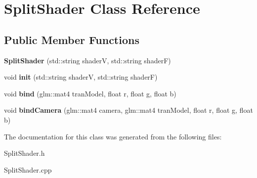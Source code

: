 \hypertarget{class_split_shader}{}\section{Split\+Shader Class Reference}
\label{class_split_shader}
\subsection*{Public Member Functions}
\begin{DoxyCompactItemize}
\item 
\hypertarget{class_split_shader_ab85af89730cc15b1f444d6846fca7c11}{}\label{class_split_shader_ab85af89730cc15b1f444d6846fca7c11} 
{\bfseries Split\+Shader} (std\+::string shaderV, std\+::string shaderF)
\item 
\hypertarget{class_split_shader_a6e3d53230b9c63337027b9fc768db4ca}{}\label{class_split_shader_a6e3d53230b9c63337027b9fc768db4ca} 
void {\bfseries init} (std\+::string shaderV, std\+::string shaderF)
\item 
\hypertarget{class_split_shader_ab25eaac7c011f3ae71acc7742edafc2d}{}\label{class_split_shader_ab25eaac7c011f3ae71acc7742edafc2d} 
void {\bfseries bind} (glm\+::mat4 tran\+Model, float r, float g, float b)
\item 
\hypertarget{class_split_shader_a4f5c5ff7e0ee232a0ff618d76db13d8d}{}\label{class_split_shader_a4f5c5ff7e0ee232a0ff618d76db13d8d} 
void {\bfseries bind\+Camera} (glm\+::mat4 camera, glm\+::mat4 tran\+Model, float r, float g, float b)
\end{DoxyCompactItemize}


The documentation for this class was generated from the following files\+:\begin{DoxyCompactItemize}
\item 
Split\+Shader.\+h\item 
Split\+Shader.\+cpp\end{DoxyCompactItemize}
